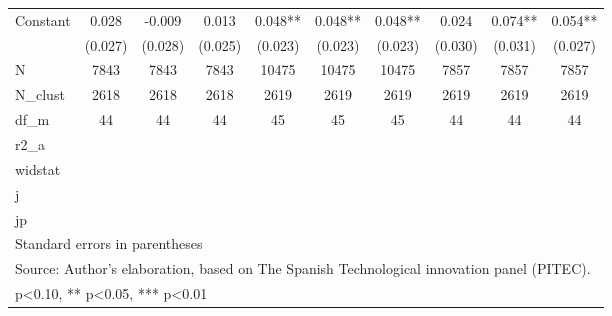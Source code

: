 \begin{table}[htbp]
\begin{tabular}{l*{9}{c}}
Constant            &       0.028   &      -0.009   &       0.013   &       0.048** &       0.048** &       0.048** &       0.024   &       0.074** &       0.054** \\
                    &     (0.027)   &     (0.028)   &     (0.025)   &     (0.023)   &     (0.023)   &     (0.023)   &     (0.030)   &     (0.031)   &     (0.027)   \\
\hline
N                   &        7843   &        7843   &        7843   &       10475   &       10475   &       10475   &        7857   &        7857   &        7857   \\
N\_clust             &        2618   &        2618   &        2618   &        2619   &        2619   &        2619   &        2619   &        2619   &        2619   \\
df\_m                &          44   &          44   &          44   &          45   &          45   &          45   &          44   &          44   &          44   \\
r2\_a                &               &               &               &               &               &               &               &               &               \\
widstat             &               &               &               &               &               &               &               &               &               \\
j                   &               &               &               &               &               &               &               &               &               \\
jp                  &               &               &               &               &               &               &               &               &               \\
\hline\hline
\multicolumn{10}{l}{\footnotesize Standard errors in parentheses}\\
\multicolumn{10}{l}{\footnotesize Source: Author's elaboration, based on The Spanish Technological innovation panel (PITEC).}\\
\multicolumn{10}{l}{\footnotesize * p<0.10, ** p<0.05, *** p<0.01}\\
\end{tabular}
\end{table}
